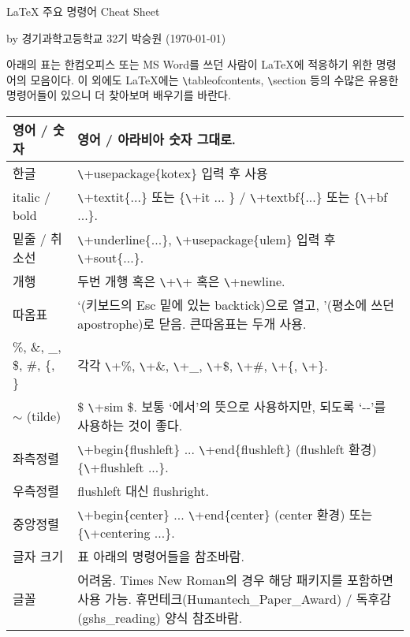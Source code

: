 \documentclass[11pt]{article}
\begin{document}
	\begin{center}
		\Large  \LaTeX{} 주요 명령어 Cheat Sheet
	\end{center}
	\begin{flushright}
		by 경기과학고등학교 32기 박승원 (\today)
	\end{flushright}
	아래의 표는 한컴오피스 또는 MS Word를 쓰던 사람이 \LaTeX 에 적응하기 위한 명령어의 모음이다.
	이 외에도 \LaTeX 에는 \verb+\+tableofcontents, \verb+\+section 등의 수많은 유용한 명령어들이 있으니 더 찾아보며 배우기를 바란다.
	
	\renewcommand{\arraystretch}{1.2}
\begin{table}[h]
	\centering
	\begin{tabular}{|p{}|p{}|}
		\hline
		영어 / 숫자 & 영어 / 아라비아 숫자 그대로. \\
		\hline
		한글 & \verb+\+usepackage\{kotex\} 입력 후 사용 \\
		\hline
		italic / bold & \verb+\+textit\{...\} 또는 \{\verb+\+it ... \} / \verb+\+textbf\{...\} 또는 \{\verb+\+bf ...\}. \\
		\hline
		밑줄 / 취소선 & \verb+\+underline\{...\}, \verb+\+usepackage\{ulem\} 입력 후 \verb+\+sout\{...\}. \\
		\hline
		개행 & 두번 개행 혹은 \verb+\+\verb+\+ 혹은 \verb+\+newline. \\
		\hline
		따옴표 & `(키보드의 Esc 밑에 있는 backtick)으로 열고, '(평소에 쓰던 apostrophe)로 닫음. 큰따옴표는 두개 사용. \\
		\hline
		\%, \&, \_, \$, \#, \{, \} & 각각 \verb+\+\%, \verb+\+\&, \verb+\+\_, \verb+\+\$, \verb+\+\#, \verb+\+\{, \verb+\+\}. \\
		\hline
		$ \sim $ (tilde) & \$ \verb+\+sim \$. 보통 `에서'의 뜻으로 사용하지만, 되도록 `-{}-'를 사용하는 것이 좋다. \\
		\hline
		좌측정렬 & \verb+\+begin\{flushleft\} ... \verb+\+end\{flushleft\} (flushleft 환경) \{\verb+\+flushleft ...\}. \\
		\hline
		우측정렬 & flushleft 대신 flushright. \\
		\hline
		중앙정렬 & \verb+\+begin\{center\} ... \verb+\+end\{center\} (center 환경) 또는 \{\verb+\+centering ...\}. \\
		\hline
		글자 크기 & 표 아래의 명령어들을 참조바람. \\
		\hline
		글꼴 & 어려움. Times New Roman의 경우 해당 패키지를 포함하면 사용 가능. 휴먼테크(Humantech\_Paper\_Award) / 독후감(gshs\_reading) 양식 참조바람. \\

\end{tabular}
\end{table}
\end{document}
